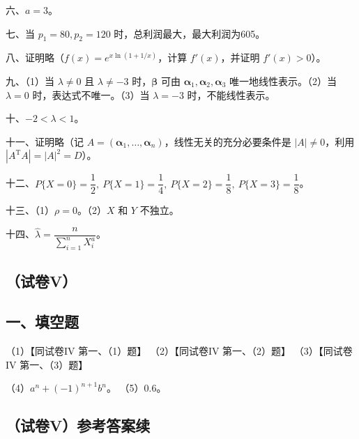 \documentclass[UTF8,12pt]{ctexart}
\begin{document}
六、\(\displaystyle a=3\)。


七、当 \(\displaystyle p_1=80,\allowbreak p_2=120\) 时，总利润最大，最大利润为605。


八、证明略（\(\displaystyle f(x)=e^{x\ln(1+1/x)}\)，计算 \(\displaystyle f\prime(x)\)，并证明 \(\displaystyle f\prime(x)>0\)）。


九、（1）当 \(\displaystyle \lambda\ne0\) 且 \(\displaystyle \lambda\ne-3\) 时，\(\displaystyle \boldsymbol\beta\) 可由 \(\displaystyle \boldsymbol\alpha_1,\allowbreak \boldsymbol\alpha_2,\allowbreak \boldsymbol\alpha_3\) 唯一地线性表示。（2）当 \(\displaystyle \lambda=0\) 时，表达式不唯一。（3）当 \(\displaystyle \lambda=-3\) 时，不能线性表示。


十、\(\displaystyle -2<\lambda<1\)。


十一、证明略（记 \(\displaystyle A=(\boldsymbol\alpha_1,\allowbreak \ldots,\allowbreak \boldsymbol\alpha_n)\)，线性无关的充分必要条件是 \(\displaystyle |A|\ne0\)，利用 \(\displaystyle |A^{\mathrm T}A|=|A|^2=D\)）。


十二、\(\displaystyle P\{X=0\}=\dfrac{\displaystyle 1}{\displaystyle 2},\allowbreak \ P\{X=1\}=\dfrac{\displaystyle 1}{\displaystyle 4},\allowbreak \ P\{X=2\}=\dfrac{\displaystyle 1}{\displaystyle 8},\allowbreak \ P\{X=3\}=\dfrac{\displaystyle 1}{\displaystyle 8}\)。


十三、（1）\(\displaystyle \rho=0\)。（2）\(\displaystyle X\) 和 \(\displaystyle Y\) 不独立。


十四、\(\displaystyle \hat\lambda=\dfrac{\displaystyle n}{\displaystyle \sum_{i=1}^nX_i^a}\)。


\subsection*{（试卷V）}

\subsection*{一、填空题}

（1）【同试卷IV 第一、（1）题】 （2）【同试卷IV 第一、（2）题】 （3）【同试卷IV 第一、（3）题】


（4）\(\displaystyle a^n+(-1)^{n+1}b^n\)。 （5）\(\displaystyle 0.6\)。


\subsection*{（试卷V）参考答案续}
\end{document}
